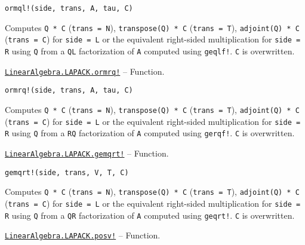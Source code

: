 \begin{adjustwidth}{2em}{0pt}


\begin{verbatim}
ormql!(side, trans, A, tau, C)
\end{verbatim}

Computes \texttt{Q * C} (\texttt{trans = N}), \texttt{transpose(Q) * C} (\texttt{trans = T}), \texttt{adjoint(Q) * C} (\texttt{trans = C}) for \texttt{side = L} or the equivalent right-sided multiplication for \texttt{side = R} using \texttt{Q} from a \texttt{QL} factorization of \texttt{A} computed using \texttt{geqlf!}. \texttt{C} is overwritten.



\end{adjustwidth}
\hypertarget{5502331798377291988}{} 
\hyperlink{5502331798377291988}{\texttt{LinearAlgebra.LAPACK.ormrq!}}  -- {Function.}

\begin{adjustwidth}{2em}{0pt}


\begin{verbatim}
ormrq!(side, trans, A, tau, C)
\end{verbatim}

Computes \texttt{Q * C} (\texttt{trans = N}), \texttt{transpose(Q) * C} (\texttt{trans = T}), \texttt{adjoint(Q) * C} (\texttt{trans = C}) for \texttt{side = L} or the equivalent right-sided multiplication for \texttt{side = R} using \texttt{Q} from a \texttt{RQ} factorization of \texttt{A} computed using \texttt{gerqf!}. \texttt{C} is overwritten.



\end{adjustwidth}
\hypertarget{15151573161204836324}{} 
\hyperlink{15151573161204836324}{\texttt{LinearAlgebra.LAPACK.gemqrt!}}  -- {Function.}

\begin{adjustwidth}{2em}{0pt}


\begin{verbatim}
gemqrt!(side, trans, V, T, C)
\end{verbatim}

Computes \texttt{Q * C} (\texttt{trans = N}), \texttt{transpose(Q) * C} (\texttt{trans = T}), \texttt{adjoint(Q) * C} (\texttt{trans = C}) for \texttt{side = L} or the equivalent right-sided multiplication for \texttt{side = R} using \texttt{Q} from a \texttt{QR} factorization of \texttt{A} computed using \texttt{geqrt!}. \texttt{C} is overwritten.



\end{adjustwidth}
\hypertarget{7595784839671568962}{} 
\hyperlink{7595784839671568962}{\texttt{LinearAlgebra.LAPACK.posv!}}  -- {Function.}

